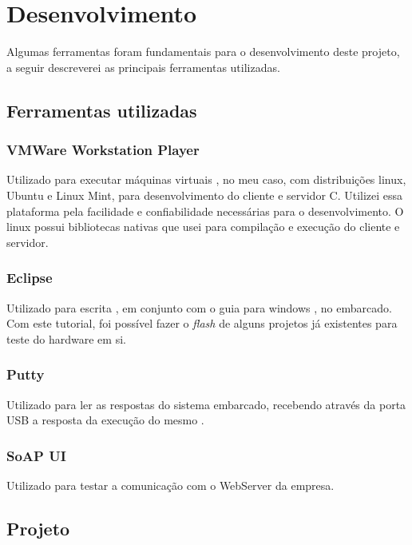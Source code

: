 \chapter{Desenvolvimento}

Algumas ferramentas foram fundamentais para o desenvolvimento deste projeto, a seguir descreverei as principais ferramentas utilizadas.

\section{Ferramentas utilizadas}

\subsection{VMWare Workstation Player}

Utilizado para executar máquinas virtuais \cite{vmware_player_ref}, no meu caso, com distribuições linux, Ubuntu\cite{ubuntu_ref} e Linux Mint\cite{linux_mint_ref}, para desenvolvimento do cliente e servidor C. Utilizei essa plataforma pela facilidade e confiabilidade necessárias para o desenvolvimento. O linux possui bibliotecas nativas que usei para compilação e execução do cliente e servidor.

\subsection {Eclipse}

Utilizado para escrita \cite{eclipse_ref}, em conjunto com o guia para windows \cite{devkit_windows_ref}, no embarcado. Com este tutorial, foi possível fazer o \textit{flash} de alguns projetos já existentes para teste do hardware em si.

\subsection{Putty}

Utilizado para ler as respostas do sistema embarcado, recebendo através da porta USB a resposta da execução do mesmo \cite{putty_ref}.

\subsection {SoAP UI}

Utilizado para testar a comunicação com o WebServer da empresa\cite{soap_ui_ref}.


\section{Projeto}

